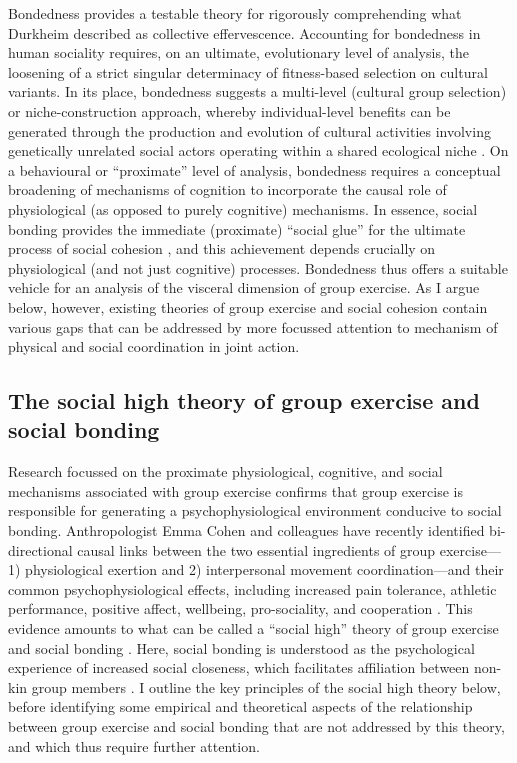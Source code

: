 \begin{CJK}{UTF8}{gbsn}
Bondedness provides a testable theory for rigorously comprehending what Durkheim described as collective effervescence.  Accounting for bondedness in human sociality requires, on an ultimate, evolutionary level of analysis, the loosening of a strict singular determinacy of fitness-based selection on cultural variants.  In its place, bondedness suggests a multi-level (cultural group selection) or niche-construction approach, whereby individual-level benefits can be generated through the production and evolution of cultural activities involving genetically unrelated social actors operating within a shared ecological niche \citep{Dunbar2012,Laland2010,Laland2015}.  On a behavioural or ``proximate'' level of analysis, bondedness requires a conceptual broadening of mechanisms of cognition to incorporate the causal role of physiological (as opposed to purely cognitive) mechanisms. In essence, social bonding provides the immediate (proximate) ``social glue'' for the ultimate process of social cohesion \citep[see][]{Lakin2003,Bastian2014a}, and this achievement depends crucially on physiological (and not just cognitive) processes.  Bondedness thus offers a suitable vehicle for an analysis of the visceral dimension of group exercise.  As I argue below, however, existing theories of group exercise and social cohesion contain various gaps that can be addressed by more focussed attention to mechanism of physical and social coordination in joint action.

\subsection{The social high theory of group exercise and social bonding \label{sect:socialHigh}}

Research focussed on the proximate physiological, cognitive, and social mechanisms associated with group exercise confirms that group exercise is responsible for generating a psychophysiological environment conducive to social bonding.  Anthropologist Emma Cohen and colleagues have recently identified bi-directional causal links between the two essential ingredients of group exercise---1) physiological exertion and 2) interpersonal movement coordination---and their common psychophysiological effects, including increased pain tolerance, athletic performance, positive affect, wellbeing, pro-sociality, and cooperation \citep{Davis2015}.  This evidence amounts to what can be called a ``social high'' theory of group exercise and social bonding \citep[hereafter ``the social high theory,'' see][]{Cohen2017}.  Here, social bonding is understood as the psychological experience of increased social closeness, which facilitates affiliation between non-kin group members \citep{Tarr2014}.  I outline the key principles of the social high theory below, before identifying some empirical and theoretical aspects of the relationship between group exercise and social bonding that are not addressed by this theory, and which thus require further attention.


\end{CJK}
